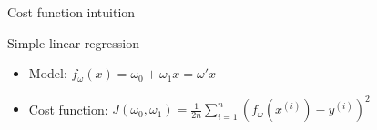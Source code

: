 \documentclass[
  9pt,
  ignorenonframetext,
  aspectratio=169,
  t, dvipsnames]{beamer}
\providecommand{\tightlist}{%
  \setlength{\itemsep}{0pt}\setlength{\parskip}{0pt}}\usepackage{longtable,booktabs,array}
\theoremstyle{definition}
\def\endcol{\end{column}}
\def\endcols{\end{columns}}
\begin{document}

\begin{frame}{Cost function intuition}
\protect\hypertarget{cost-function-intuition-2}{}
\begin{block}{Simple linear regression}

\begin{itemize}
\tightlist
\item
  Model: \(f_{\omega}(x) = \omega_0 + \omega_1 x = \omega'x\)
\item
  Cost function:
  \(J(\omega_0,\omega_1) = \frac{1}{2 n} \sum_{i=1}^{n}\left(f_{\omega}\left(x^{(i)}\right)-y^{(i)}\right)^{2}\)
\end{itemize}

\end{block}

\begin{figure}

\begin{minipage}[t]{0.33\linewidth}

{\centering 


}

\end{minipage}%
%
\begin{minipage}[t]{0.33\linewidth}

{\centering 

}
\end{minipage}
\end{figure}
\end{frame}
\end{document}

